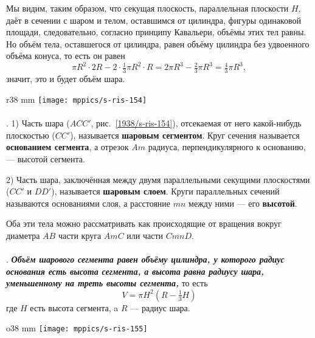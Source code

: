 {Мы видим, таким образом, что секущая плоскость, параллельная плоскости $H$, даёт в сечении с шаром и телом, оставшимся от цилиндра, фигуры одинаковой площади, следовательно, согласно принципу Кавальери, объёмы этих тел равны.
Но объём тела, оставшегося от цилиндра, равен объёму цилиндра без удвоенного объёма конуса, то есть он равен
\[\pi R^2\cdot 2R - 2 \cdot \tfrac13\pi R^2\cdot R = 2\pi R^3 - \tfrac23\pi R^3 = \tfrac43\pi R^3,\]
значит, это и будет объём шара.

}

\begin{wrapfigure}{r}{38 mm}
\vskip-0mm
\centering
\texttt{[image: mppics/s-ris-154]}
\caption{}\label{1938/s-ris-154}
\vskip-0mm
\end{wrapfigure}

\paragraph{}\label{1938/s148}
\mbox{.}
1) Часть шара ($ACC'$, рис.~\ref{1938/s-ris-154}), отсекаемая от него какой-нибудь плоскостью ($CC'$), называется \textbf{шаровым сегментом}.
Круг сечения называется \textbf{основанием сегмента}, а отрезок $Am$ радиуса, перпендикулярного к основанию, — высотой сегмента.

2) Часть шара, заключённая между двумя параллельными секущими плоскостями ($CC'$ и $DD'$), называется \textbf{шаровым слоем}.
Круги параллельных сечений называются основаниями слоя, а расстояние $mn$ между ними — его \textbf{высотой}.

Оба эти тела можно рассматривать как происходящие от вращения вокруг диаметра $AB$ части круга $AmC$ или части $CmnD$.

\paragraph{}\label{1938/s149}
\mbox{.}
\textbf{\emph{Объём шарового сегмента равен объёму цилиндра, у которого радиус основания есть высота сегмента, а высота равна радиусу шара, уменьшенному на треть высоты сегмента,}} то есть
\[ V = \pi H^2(R-\tfrac13 H)\]
где $H$ есть высота сегмента, a $R$ — радиус шара.


\begin{wrapfigure}{o}{38 mm}
\vskip-0mm
\centering
\texttt{[image: mppics/s-ris-155]}
\caption{}\label{1938/s-ris-155}
\vskip-0mm
\end{wrapfigure}


